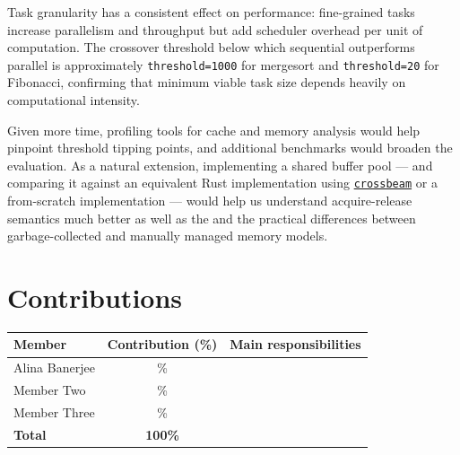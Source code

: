\documentclass[11pt,a4paper]{article}
\begin{document}
Task granularity has a consistent effect on performance: fine-grained tasks
increase parallelism and throughput but add scheduler overhead per unit of
computation. The crossover threshold below which sequential outperforms parallel
is approximately \texttt{threshold=1000} for mergesort and
\texttt{threshold=20} for Fibonacci, confirming that minimum viable task size
depends heavily on computational intensity.

Given more time, profiling tools for cache and memory analysis would help
pinpoint threshold tipping points, and additional benchmarks would broaden the
evaluation. As a natural extension, implementing a shared buffer pool — and
comparing it against an equivalent Rust implementation using
\href{https://docs.rs/crossbeam-deque/latest/crossbeam_deque/}{\texttt{crossbeam}}
or a from-scratch implementation — would help us understand acquire-release semantics
much better as well as the and the practical differences between
garbage-collected and manually managed memory models.

\section*{Contributions}
\label{sec:contributions}


\begin{center}
\begin{tabular}{@{}lcl@{}}
\toprule
\textbf{Member} & \textbf{Contribution (\%)} & \textbf{Main responsibilities} \\
\midrule
Alina Banerjee  & \% & \\
Member Two      & \% & \\
Member Three    & \% & \\
\midrule
\textbf{Total} & \textbf{100\%} & \\
\bottomrule
\end{tabular}
\end{center}



\end{document}

